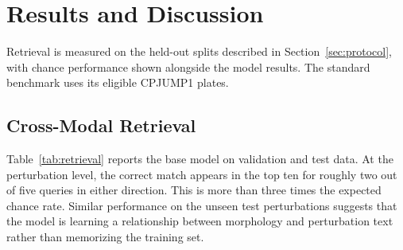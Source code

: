 \section{Results and Discussion}
\label{sec:results}

Retrieval is measured on the held-out splits described in Section~\ref{sec:protocol}, with chance
performance shown alongside the model results. The standard benchmark uses its eligible CPJUMP1
plates.

\subsection{Cross-Modal Retrieval}

Table~\ref{tab:retrieval} reports the base model on validation and test data. At the perturbation
level, the correct match appears in the top ten for roughly two out of five queries in either
direction. This is more than three times the expected chance rate. Similar performance on the
unseen test perturbations suggests that the model is learning a relationship between morphology and
perturbation text rather than memorizing the training set.

